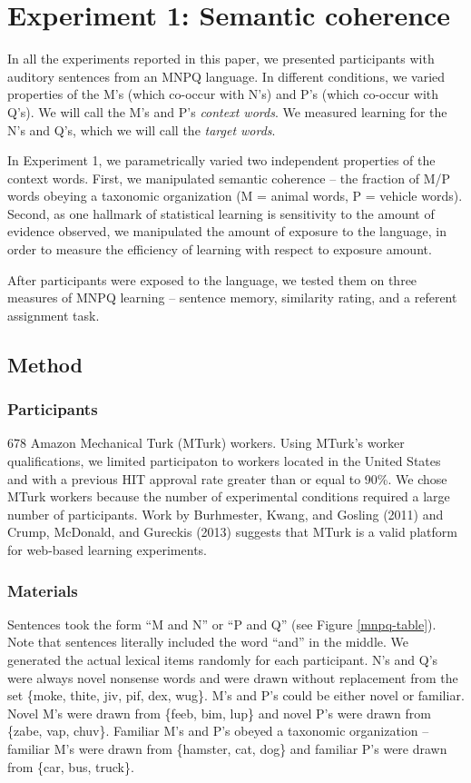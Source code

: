 \documentclass[man,floatsintext]{apa6}
\begin{document}
\section{Experiment 1: Semantic coherence}

In all the experiments reported in this paper, we presented participants with auditory sentences from an MNPQ language. In different conditions, we varied properties of the M's (which co-occur with N's) and P's (which co-occur with Q's). We will call the M's and P's \emph{context words}. We measured learning for the N's and Q's, which we will call the \emph{target words}.

In Experiment 1, we parametrically varied two independent properties of the context words. First, we manipulated semantic coherence -- the fraction of M/P words obeying a taxonomic organization (M = animal words, P = vehicle words). Second, as one hallmark of statistical learning is sensitivity to the amount of evidence observed, we manipulated the amount of exposure to the language, in order to measure the efficiency of learning with respect to exposure amount.

After participants were exposed to the language, we tested them on three measures of MNPQ learning -- sentence memory, similarity rating, and a referent assignment task.

\subsection{Method}

\subsubsection{Participants}
678 Amazon Mechanical Turk (MTurk) workers. Using MTurk's worker qualifications, we limited participaton to workers located in the United States and with a previous HIT approval rate greater than or equal to 90\%. We chose MTurk workers because the number of experimental conditions required a large number of participants. Work by Burhmester, Kwang, and Gosling (2011) and Crump, McDonald, and Gureckis (2013) suggests that MTurk is a valid platform for web-based learning experiments.

\subsubsection{Materials}
Sentences took the form ``M and N'' or ``P and Q'' (see Figure \ref{mnpq-table}). Note that sentences literally included the word ``and'' in the middle. We generated the actual lexical items randomly for each participant. N's and Q's were always novel nonsense words and were drawn without replacement from the set \{moke, thite, jiv, pif, dex, wug\}. M's and P's could be either novel or familiar. Novel M's were drawn from \{feeb, bim, lup\} and novel P's were drawn from \{zabe, vap, chuv\}. Familiar M's and P's obeyed a taxonomic organization -- familiar M's were drawn from \{hamster, cat, dog\} and familiar P's were drawn from \{car, bus, truck\}.
\end{document}
